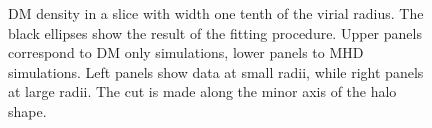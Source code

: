 \documentclass[a4paper,fleqn,usenatbib]{mnras}
\begin{document}
\begin{figure}
  \centering
  \hfill
  \hfill 

  \hfill
  \hfill 
  \caption{DM density in a slice with width one tenth of the virial radius.
  The black ellipses show the result of the fitting procedure. 
  Upper panels correspond to DM only simulations, lower panels to MHD simulations.
  Left panels show data at small radii, while right panels at large
  radii.
  The cut is made along the minor axis of the halo shape.}
\label{fig:slices}
\end{figure}
\end{document}
